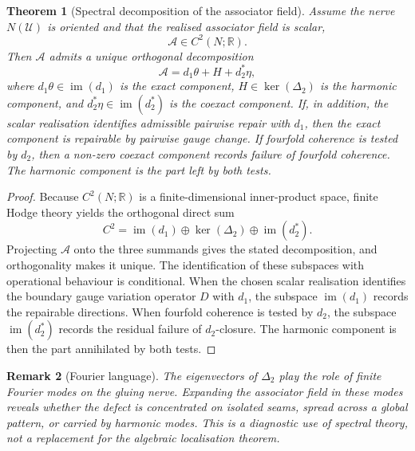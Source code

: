 \documentclass[11pt]{article}
\newtheorem{theorem}{Theorem}[section]
\newtheorem{remark}[theorem]{Remark}
\newcommand{\im}{\operatorname{im}}
\newcommand{\R}{\mathbb{R}}
\begin{document}
\begin{theorem}[Spectral decomposition of the associator field]
Assume the nerve \(N(\mathcal U)\) is oriented and that the realised associator field is scalar,
\[
\mathcal A\in C^2(N;\R).
\]
Then \(\mathcal A\) admits a unique orthogonal decomposition
\[
\mathcal A=d_1\theta+H+d_2^*\eta,
\]
where \(d_1\theta\in \im(d_1)\) is the exact component, \(H\in \ker(\Delta_2)\) is the harmonic component, and \(d_2^*\eta\in \im(d_2^*)\) is the coexact component. If, in addition, the scalar realisation identifies admissible pairwise repair with \(d_1\), then the exact component is repairable by pairwise gauge change. If fourfold coherence is tested by \(d_2\), then a non-zero coexact component records failure of fourfold coherence. The harmonic component is the part left by both tests.
\end{theorem}

\begin{proof}
Because \(C^2(N;\R)\) is a finite-dimensional inner-product space, finite Hodge theory yields the orthogonal direct sum
\[
C^2=\im(d_1)\oplus \ker(\Delta_2)\oplus \im(d_2^*).
\]
Projecting \(\mathcal A\) onto the three summands gives the stated decomposition, and orthogonality makes it unique. The identification of these subspaces with operational behaviour is conditional. When the chosen scalar realisation identifies the boundary gauge variation operator \(D\) with \(d_1\), the subspace \(\im(d_1)\) records the repairable directions. When fourfold coherence is tested by \(d_2\), the subspace \(\im(d_2^*)\) records the residual failure of \(d_2\)-closure. The harmonic component is then the part annihilated by both tests.
\end{proof}

\begin{remark}[Fourier language]
The eigenvectors of \(\Delta_2\) play the role of finite Fourier modes on the gluing nerve. Expanding the associator field in these modes reveals whether the defect is concentrated on isolated seams, spread across a global pattern, or carried by harmonic modes. This is a diagnostic use of spectral theory, not a replacement for the algebraic localisation theorem.
\end{remark}
\end{document}

